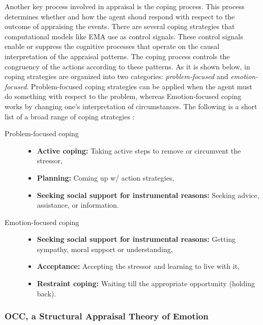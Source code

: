 \documentclass[12pt]{report}
\begin{document}
Another key process involved in appraisal is the coping process. This process
determines whether and how the agent shoud respond with respect to the outcome
of appraising the events. There are several coping strategies that computational
models like EMA \cite{gratch:domain-independent} use as control signals. These
control signals enable or suppress the cognitive processes that operate on the
causal interpretation of the appraisal patterns. The coping process controls the
congruency of the actions according to these patterns. As it is shown below, in
\cite{gratch:domain-independent} coping strategies are organized into two
categories: \textit{problem-focused} and \textit{emotion-focused}.
Problem-focused coping strategies can be applied when the agent must do
something with respect to the problem, whereas Emotion-focused coping works by
changing one's interpretation of circumstances. The following is a short list of
a broad range of coping strategies \cite{gratch:domain-independent}:

\begin{description}
  \item[Problem-focused coping] \hfill
	\begin{itemize}
	  \item \textbf{Active coping:} Taking active steps to remove or circumvent the
	  stressor,
	  \item \textbf{Planning:} Coming up w/ action strategies,
	  \item \textbf{Seeking social support for instrumental reasons:} Seeking
	  advice, assistance, or information.
	\end{itemize}
  \item[Emotion-focused coping] \hfill
    \begin{itemize}
	  \item \textbf{Seeking social support for instrumental reasons:} Getting
	  sympathy, moral support or understanding,
	  \item \textbf{Acceptance:} Accepting the stressor and learning to live with
	  it,
	  \item \textbf{Restraint coping:} Waiting till the appropriate opportunity
	  (holding back).
	\end{itemize}
\end{description}

\subsubsection{OCC, a Structural Appraisal Theory of Emotion}
\end{document}
